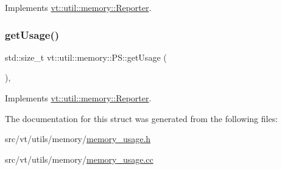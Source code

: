 Implements \hyperlink{structvt_1_1util_1_1memory_1_1_reporter_a83fc36e9cff3ce2deedf1d4546694713}{vt\+::util\+::memory\+::\+Reporter}.

\mbox{\label{structvt_1_1util_1_1memory_1_1_p_s_a8637d08841cd23f361e83be9cc15e2b4}} 
\subsubsection{\texorpdfstring{get\+Usage()}{getUsage()}}
{\footnotesize\ttfamily std\+::size\+\_\+t vt\+::util\+::memory\+::\+P\+S\+::get\+Usage (\begin{DoxyParamCaption}{ }\end{DoxyParamCaption})\hspace{0.3cm}{\ttfamily [override]}, {\ttfamily [virtual]}}



Implements \hyperlink{structvt_1_1util_1_1memory_1_1_reporter_a372574f51fdb68077cd3d227ee373de5}{vt\+::util\+::memory\+::\+Reporter}.



The documentation for this struct was generated from the following files\+:\begin{DoxyCompactItemize}
\item 
src/vt/utils/memory/\hyperlink{memory__usage_8h}{memory\+\_\+usage.\+h}\item 
src/vt/utils/memory/\hyperlink{memory__usage_8cc}{memory\+\_\+usage.\+cc}\end{DoxyCompactItemize}
